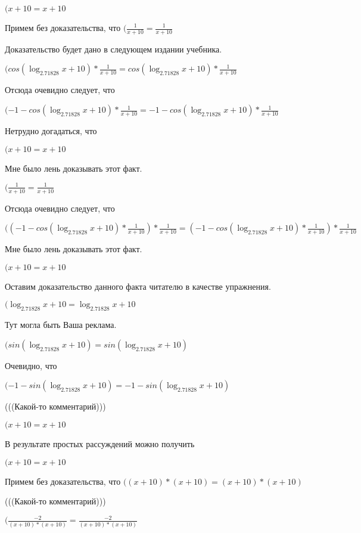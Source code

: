 \documentclass[12pt,a4paper,fleqn]{article}
\theoremstyle{definition}
\begin{document}
$( x  +  10  =  x  +  10 $

Примем без доказательства, что
$(\frac{ 1 }{ x  +  10 }
 = \frac{ 1 }{ x  +  10 }
$

Доказательство будет дано в следующем издании учебника.

$(cos(\log_{ 2.71828 }{ x  +  10 }) * \frac{ 1 }{ x  +  10 }
 = cos(\log_{ 2.71828 }{ x  +  10 }) * \frac{ 1 }{ x  +  10 }
$

Отсюда очевидно следует, что

$( -1  - cos(\log_{ 2.71828 }{ x  +  10 }) * \frac{ 1 }{ x  +  10 }
 =  -1  - cos(\log_{ 2.71828 }{ x  +  10 }) * \frac{ 1 }{ x  +  10 }
$

Нетрудно догадаться, что

$( x  +  10  =  x  +  10 $

Мне было лень доказывать этот факт.

$(\frac{ 1 }{ x  +  10 }
 = \frac{ 1 }{ x  +  10 }
$

Отсюда очевидно следует, что

$(( -1  - cos(\log_{ 2.71828 }{ x  +  10 }) * \frac{ 1 }{ x  +  10 }
) * \frac{ 1 }{ x  +  10 }
 = ( -1  - cos(\log_{ 2.71828 }{ x  +  10 }) * \frac{ 1 }{ x  +  10 }
) * \frac{ 1 }{ x  +  10 }
$

Мне было лень доказывать этот факт.

$( x  +  10  =  x  +  10 $

Оставим доказательство данного факта читателю в качестве упражнения.

$(\log_{ 2.71828 }{ x  +  10 } = \log_{ 2.71828 }{ x  +  10 }$

Тут могла быть Ваша реклама.

$(sin(\log_{ 2.71828 }{ x  +  10 }) = sin(\log_{ 2.71828 }{ x  +  10 })$

Очевидно, что

$( -1  - sin(\log_{ 2.71828 }{ x  +  10 }) =  -1  - sin(\log_{ 2.71828 }{ x  +  10 })$

(((Какой-то комментарий)))

$( x  +  10  =  x  +  10 $

В результате простых рассуждений можно получить

$( x  +  10  =  x  +  10 $

Примем без доказательства, что
$(( x  +  10 ) * ( x  +  10 ) = ( x  +  10 ) * ( x  +  10 )$

(((Какой-то комментарий)))

$(\frac{ -2 }{( x  +  10 ) * ( x  +  10 )}
 = \frac{ -2 }{( x  +  10 ) * ( x  +  10 )}
$
\end{document}

